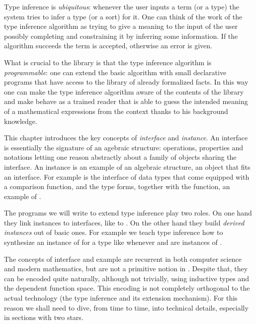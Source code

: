 Type inference is \emph{ubiquitous}: whenever the user inputs a term
(or a type) the system tries to infer a type (or
a sort) for it.  One can think of the work of the type inference
algorithm as trying to give a meaning to the input of the
user possibly completing and constraining it by inferring some
information.  If the algorithm succeeds the term is accepted,
otherwise an error is given.

What is crucial to the \mcbMC{} library is that the
type inference algorithm is \emph{programmable}: one can extend the
basic algorithm with small declarative programs that have access to
the library of already formalized facts.  In this way one can make the
type inference algorithm aware of the contents of the library and
make \Coq{} behave as a trained reader that is able to guess the
intended meaning of a mathematical expressions from the context
thanks to his background knowledge.

This chapter introduces the key concepts of \emph{interface}
and \emph{instance}.  An interface is essentially the signature
of an agebraic structure: operations, properties and notations
letting one reason abstractly about a family of objects sharing
the interface.
An instance is an example of an algebraic structure,
an object that fits an interface.
For example  is the interface of
data types that come equipped with a comparison function, and
the type  forms, together with the  function, an
example of .

The programs we will write to
extend type inference play two roles.  On one hand they link
instances to interfaces, like  to .
On the other hand they build \emph{derived
instances} out of basic ones.  For example we teach type inference
how to synthesize an instance of  for a type like
 whenever  and  are instances of .

The concepts of interface and example are recurrent in
both computer science and modern mathematics, but are not a primitive
notion in \Coq{}.  Despite that, they can be encoded quite naturally,
although not trivially, using inductive types and the dependent function
space.   This encoding is not completely orthogonal to the
actual technology (the type inference and its extension mechanism).
For this reason we shall need to dive, from time to time, into
technical details, especially in sections with two stars.

\mcbREQUIRE{}
\label{sec:hounif}

